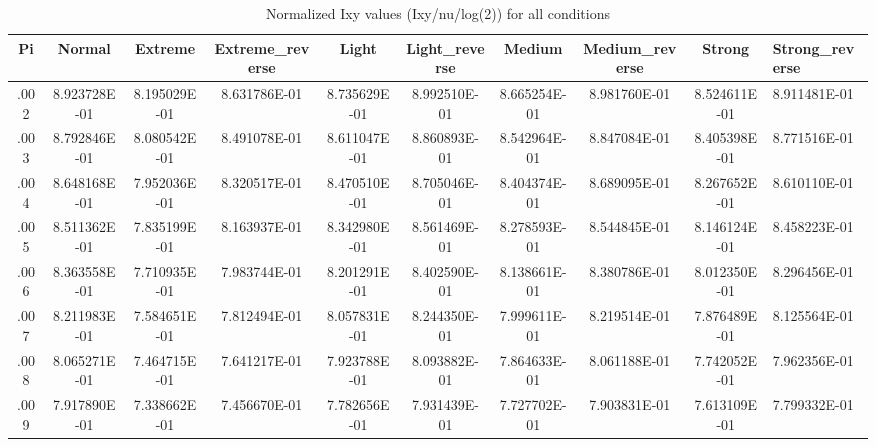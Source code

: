 \begin{table}[htbp]
\centering
\caption{Normalized Ixy values (Ixy/nu/log(2)) for all conditions}
\begin{tabular}{|c|cccccccc|}
\hline
Pi & Normal & Extreme & Extreme\_reverse & Light & Light\_reverse & Medium & Medium\_reverse & Strong & Strong\_reverse \\
\hline
.002 & 8.923728E-01 & 8.195029E-01 & 8.631786E-01 & 8.735629E-01 & 8.992510E-01 & 8.665254E-01 & 8.981760E-01 & 8.524611E-01 & 8.911481E-01 \\
.003 & 8.792846E-01 & 8.080542E-01 & 8.491078E-01 & 8.611047E-01 & 8.860893E-01 & 8.542964E-01 & 8.847084E-01 & 8.405398E-01 & 8.771516E-01 \\
.004 & 8.648168E-01 & 7.952036E-01 & 8.320517E-01 & 8.470510E-01 & 8.705046E-01 & 8.404374E-01 & 8.689095E-01 & 8.267652E-01 & 8.610110E-01 \\
.005 & 8.511362E-01 & 7.835199E-01 & 8.163937E-01 & 8.342980E-01 & 8.561469E-01 & 8.278593E-01 & 8.544845E-01 & 8.146124E-01 & 8.458223E-01 \\
.006 & 8.363558E-01 & 7.710935E-01 & 7.983744E-01 & 8.201291E-01 & 8.402590E-01 & 8.138661E-01 & 8.380786E-01 & 8.012350E-01 & 8.296456E-01 \\
.007 & 8.211983E-01 & 7.584651E-01 & 7.812494E-01 & 8.057831E-01 & 8.244350E-01 & 7.999611E-01 & 8.219514E-01 & 7.876489E-01 & 8.125564E-01 \\
.008 & 8.065271E-01 & 7.464715E-01 & 7.641217E-01 & 7.923788E-01 & 8.093882E-01 & 7.864633E-01 & 8.061188E-01 & 7.742052E-01 & 7.962356E-01 \\
.009 & 7.917890E-01 & 7.338662E-01 & 7.456670E-01 & 7.782656E-01 & 7.931439E-01 & 7.727702E-01 & 7.903831E-01 & 7.613109E-01 & 7.799332E-01 \\
\hline
\end{tabular}
\end{table}
